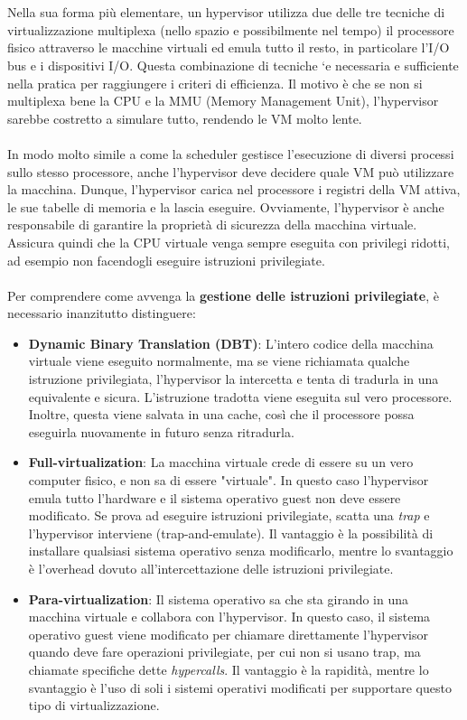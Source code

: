 \\
\\
Nella sua forma più elementare, un hypervisor utilizza due delle tre tecniche di virtualizzazione multiplexa (nello spazio e possibilmente nel tempo) il processore fisico attraverso le
macchine virtuali ed emula tutto il resto, in particolare l’I/O bus e i dispositivi I/O. Questa
combinazione di tecniche `e necessaria e sufficiente nella pratica per raggiungere i criteri
di efficienza. Il motivo è che se non si multiplexa bene la CPU e la MMU (Memory Management Unit), l’hypervisor sarebbe costretto a simulare tutto, rendendo le VM molto lente.
\\
\\
In modo molto simile a come la scheduler gestisce l'esecuzione di diversi processi sullo stesso processore, anche l’hypervisor deve decidere quale VM può utilizzare la macchina. Dunque, l'hypervisor carica nel processore i registri della VM attiva, le sue tabelle di memoria e la lascia eseguire. Ovviamente, l’hypervisor è anche responsabile di garantire la proprietà di sicurezza
della macchina virtuale. Assicura quindi che la CPU virtuale venga sempre eseguita con
privilegi ridotti, ad esempio non facendogli eseguire istruzioni privilegiate.
\\
\\
Per comprendere come avvenga la \textbf{gestione delle istruzioni privilegiate}, è necessario inanzitutto distinguere:
\begin{itemize}
    \item \textbf{Dynamic Binary Translation (DBT)}: L'intero codice della macchina virtuale viene eseguito normalmente, ma se viene richiamata qualche istruzione privilegiata, l'hypervisor la intercetta e tenta di tradurla in una equivalente e sicura. L'istruzione tradotta viene eseguita sul vero processore. Inoltre, questa viene salvata in una cache, così che il processore possa eseguirla nuovamente in futuro senza ritradurla.
    \item \textbf{Full-virtualization}: La macchina virtuale crede di essere su un vero computer fisico, e non sa di essere "virtuale". In questo caso l’hypervisor emula tutto l'hardware e il sistema operativo guest non deve essere modificato. Se prova ad eseguire istruzioni privilegiate, scatta una \textit{trap} e l’hypervisor interviene (trap-and-emulate). Il vantaggio è la possibilità di installare qualsiasi sistema operativo senza modificarlo, mentre lo svantaggio è l'overhead dovuto all'intercettazione delle istruzioni privilegiate.
    \item \textbf{Para-virtualization}: Il sistema operativo sa che sta girando in una macchina virtuale e collabora con l’hypervisor. In questo caso, il sistema operativo guest viene modificato per chiamare direttamente l’hypervisor quando deve fare operazioni privilegiate, per cui non si usano trap, ma chiamate specifiche dette \textit{hypercalls}. Il vantaggio è la rapidità, mentre lo svantaggio è l'uso di soli i sistemi operativi modificati per supportare questo tipo di virtualizzazione.
\end{itemize}
